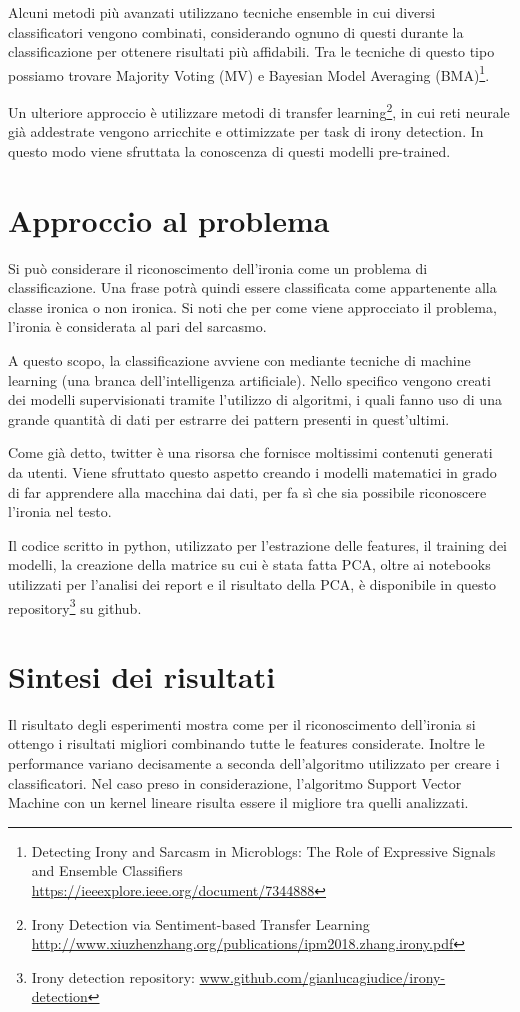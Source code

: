 \documentclass[oneside]{book}
\begin{document}
Alcuni metodi più avanzati utilizzano tecniche ensemble in cui diversi classificatori vengono combinati, considerando ognuno di questi durante la classificazione per ottenere risultati più affidabili. Tra le tecniche di questo tipo possiamo trovare Majority Voting (MV) e Bayesian Model Averaging (BMA)\footnote{Detecting Irony and Sarcasm in Microblogs: The Role of Expressive Signals and Ensemble Classifiers\\ \url{https://ieeexplore.ieee.org/document/7344888}}.

Un ulteriore approccio è utilizzare metodi di transfer learning\footnote{Irony Detection via Sentiment-based Transfer Learning\\ \url{http://www.xiuzhenzhang.org/publications/ipm2018.zhang.irony.pdf}}, in cui reti neurale già addestrate vengono arricchite e ottimizzate per task di irony detection. In questo modo viene sfruttata la conoscenza di questi modelli pre-trained.

\section{Approccio al problema}
Si può considerare il riconoscimento dell'ironia come un problema di classificazione. Una frase potrà quindi essere classificata come appartenente alla classe ironica o non ironica. Si noti che per come viene approcciato il problema, l'ironia è considerata al pari del sarcasmo.

A questo scopo, la classificazione avviene con mediante tecniche di machine learning (una branca dell'intelligenza artificiale). Nello specifico vengono creati dei modelli supervisionati tramite l'utilizzo di algoritmi, i quali fanno uso di una grande quantità di dati per estrarre dei pattern presenti in quest'ultimi.

Come già detto, twitter è una risorsa che fornisce moltissimi contenuti generati da utenti. Viene sfruttato questo aspetto creando i modelli matematici in grado di far apprendere alla macchina dai dati, per fa sì che sia possibile riconoscere l'ironia nel testo.

Il codice scritto in python, utilizzato per l'estrazione delle features, il training dei modelli, la creazione della matrice su cui è stata fatta PCA, oltre ai notebooks utilizzati per l'analisi dei report e il risultato della PCA, è disponibile in questo repository\footnote{Irony detection repository: \url{www.github.com/gianlucagiudice/irony-detection}} su github.

\section{Sintesi dei risultati}
Il risultato degli esperimenti mostra come per il riconoscimento dell'ironia si ottengo i risultati migliori combinando tutte le features considerate. Inoltre le performance variano decisamente a seconda dell'algoritmo utilizzato per creare i classificatori. Nel caso preso in considerazione, l'algoritmo Support Vector Machine con un kernel lineare risulta essere il migliore tra quelli analizzati.
\end{document}
